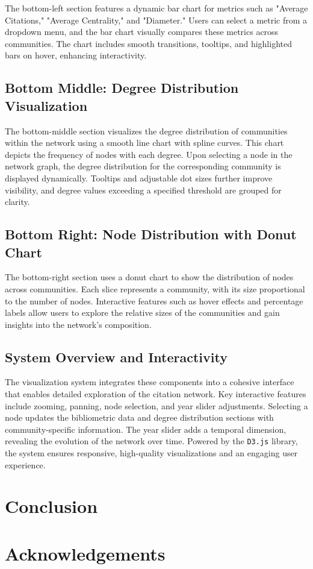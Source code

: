 \documentclass[11pt]{article}
\begin{document}
The bottom-left section features a dynamic bar chart for metrics such as "Average Citations," "Average Centrality," and "Diameter." Users can select a metric from a dropdown menu, and the bar chart visually compares these metrics across communities. The chart includes smooth transitions, tooltips, and highlighted bars on hover, enhancing interactivity.

\subsection{Bottom Middle: Degree Distribution Visualization}

The bottom-middle section visualizes the degree distribution of communities within the network using a smooth line chart with spline curves. This chart depicts the frequency of nodes with each degree. Upon selecting a node in the network graph, the degree distribution for the corresponding community is displayed dynamically. Tooltips and adjustable dot sizes further improve visibility, and degree values exceeding a specified threshold are grouped for clarity.

\subsection{Bottom Right: Node Distribution with Donut Chart}

The bottom-right section uses a donut chart to show the distribution of nodes across communities. Each slice represents a community, with its size proportional to the number of nodes. Interactive features such as hover effects and percentage labels allow users to explore the relative sizes of the communities and gain insights into the network's composition.

\subsection{System Overview and Interactivity}

The visualization system integrates these components into a cohesive interface that enables detailed exploration of the citation network. Key interactive features include zooming, panning, node selection, and year slider adjustments. Selecting a node updates the bibliometric data and degree distribution sections with community-specific information. The year slider adds a temporal dimension, revealing the evolution of the network over time. Powered by the \texttt{D3.js} library, the system ensures responsive, high-quality visualizations and an engaging user experience.


\section{Conclusion}

\section*{Acknowledgements}


% 
% 



\end{document}
